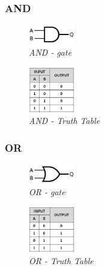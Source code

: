 \documentclass{article}
\begin{document}
\subsubsection{AND}
\begin{figure}[h]
\begin{center}
\begin{minipage}[b]{4cm}
\centering
\includegraphics[width=2cm]{and_gate.png}\\\textit{AND - gate}
\end{minipage}
\begin{minipage}[b]{2cm}
\centering
\includegraphics[width=2cm]{and_truthtable.png}\\\textit{AND - Truth Table}
\end{minipage}
\end{center}
\end{figure}
\subsubsection{OR}
\begin{figure}[h]
\begin{center}
\begin{minipage}[b]{4cm}
\centering
\includegraphics[width=2cm]{or_gate.png}\\\textit{OR - gate}
\end{minipage}
\begin{minipage}[b]{2cm}
\centering
\includegraphics[width=2cm]{or_truthtable.png}\\\textit{OR - Truth Table}
\end{minipage}
\end{center}
\end{figure}
\newpage
\end{document}
